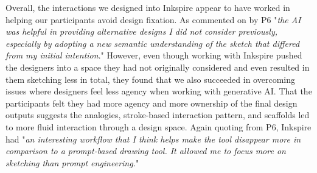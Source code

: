 \documentclass[sigconf, screen]{acmart}
\begin{document}
Overall, the interactions we designed into Inkspire appear to have worked in helping our participants avoid design fixation.
As commented on by P6 "\textit{the AI was helpful in providing alternative designs I did not consider previously, especially by adopting a new semantic understanding of the sketch that differed from my initial intention}."
However, even though working with Inkspire pushed the designers into a space they had not originally considered and even resulted in them sketching less in total, they found that we also succeeded in overcoming issues where designers feel less agency when working with generative AI.
That the participants felt they had more agency and more ownership of the final design outputs suggests the analogies, stroke-based interaction pattern, and scaffolds led to more fluid interaction through a design space.
Again quoting from P6, Inkspire had "\textit{an interesting workflow that I think helps make the tool disappear more in comparison to a prompt-based drawing tool. It allowed me to focus more on sketching than prompt engineering.}"
\end{document}
